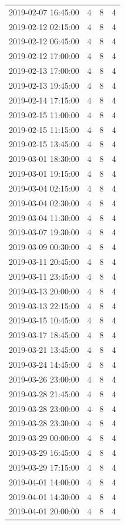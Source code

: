 \begin{tabular}{lrrr}
2019-02-07 16:45:00 & 4 & 8 & 4 \\
2019-02-12 02:15:00 & 4 & 8 & 4 \\
2019-02-12 06:45:00 & 4 & 8 & 4 \\
2019-02-12 17:00:00 & 4 & 8 & 4 \\
2019-02-13 17:00:00 & 4 & 8 & 4 \\
2019-02-13 19:45:00 & 4 & 8 & 4 \\
2019-02-14 17:15:00 & 4 & 8 & 4 \\
2019-02-15 11:00:00 & 4 & 8 & 4 \\
2019-02-15 11:15:00 & 4 & 8 & 4 \\
2019-02-15 13:45:00 & 4 & 8 & 4 \\
2019-03-01 18:30:00 & 4 & 8 & 4 \\
2019-03-01 19:15:00 & 4 & 8 & 4 \\
2019-03-04 02:15:00 & 4 & 8 & 4 \\
2019-03-04 02:30:00 & 4 & 8 & 4 \\
2019-03-04 11:30:00 & 4 & 8 & 4 \\
2019-03-07 19:30:00 & 4 & 8 & 4 \\
2019-03-09 00:30:00 & 4 & 8 & 4 \\
2019-03-11 20:45:00 & 4 & 8 & 4 \\
2019-03-11 23:45:00 & 4 & 8 & 4 \\
2019-03-13 20:00:00 & 4 & 8 & 4 \\
2019-03-13 22:15:00 & 4 & 8 & 4 \\
2019-03-15 10:45:00 & 4 & 8 & 4 \\
2019-03-17 18:45:00 & 4 & 8 & 4 \\
2019-03-21 13:45:00 & 4 & 8 & 4 \\
2019-03-24 14:45:00 & 4 & 8 & 4 \\
2019-03-26 23:00:00 & 4 & 8 & 4 \\
2019-03-28 21:45:00 & 4 & 8 & 4 \\
2019-03-28 23:00:00 & 4 & 8 & 4 \\
2019-03-28 23:30:00 & 4 & 8 & 4 \\
2019-03-29 00:00:00 & 4 & 8 & 4 \\
2019-03-29 16:45:00 & 4 & 8 & 4 \\
2019-03-29 17:15:00 & 4 & 8 & 4 \\
2019-04-01 14:00:00 & 4 & 8 & 4 \\
2019-04-01 14:30:00 & 4 & 8 & 4 \\
2019-04-01 20:00:00 & 4 & 8 & 4 \\

\end{tabular}
